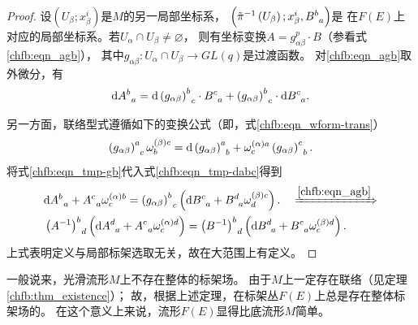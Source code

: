 \begin{proof}
设$\left(U_{\beta} ; x_{\beta}^{i}\right)$是$M$的另一局部坐标系，
$\left(\tilde{\pi}^{-1}\left(U_{\beta}\right) ; x_{\beta}^{i}, B_{\hphantom{a}a}^{b}\right)$是
在$F(E)$上对应的局部坐标系。若$U_{\alpha} \cap U_{\beta} \neq \varnothing$，
则有坐标变换$A=g_{\alpha \beta}^p \cdot B$（参看式\eqref{chfb:eqn_agb}），
其中$g_{\alpha \beta}: U_{\alpha} \cap U_{\beta} \rightarrow GL(q)$是过渡函数。
对\eqref{chfb:eqn_agb}取外微分，有
\begin{equation}\label{chfb:eqn_tmp-dabc}
    \mathrm{d} A_{\hphantom{a}a}^{b}=\mathrm{d}\left(g_{\alpha \beta}\right)_{\hphantom{a}c}^{b} \cdot 
    B_{\hphantom{a}a}^{c}+\left(g_{\alpha \beta}\right)_{\hphantom{a}c}^{b} \cdot \mathrm{d} B_{\hphantom{a}a}^{c}.
\end{equation}

另一方面，联络型式遵循如下的变换公式（即，式\eqref{chfb:eqn_wform-trans}）
\begin{equation}\label{chfb:eqn_tmp-gb}
    \left(g_{\alpha \beta}\right)_{\hphantom{a}c}^{a} \omega_{b}^{(\beta) c}=\mathrm{d}
    \left(g_{\alpha\beta}\right)_{\hphantom{a}b}^{a}+
    \omega_{c}^{(\alpha) a} \left(g_{\alpha \beta}\right)_{\hphantom{a}b}^{c}.
\end{equation}
将式\eqref{chfb:eqn_tmp-gb}代入式\eqref{chfb:eqn_tmp-dabc}得到 
\begin{align*}
    &\mathrm{d} A_{\hphantom{a}a}^{b}+A_{\hphantom{a}a}^{c}  \omega_{c}^{(\alpha) b}
    =\left(g_{\alpha \beta}\right)_{\hphantom{a}c}^{b}\left(\mathrm{d} B_{\hphantom{a}a}^{c}
    +B_{\hphantom{a}a}^{d}  \omega_{d}^{(\beta) c}\right).
\quad \xRightarrow{\ref{chfb:eqn_agb}} \\
&\left(A^{-1}\right)_{\hphantom{a}d}^{b} \left(\mathrm{d} A_{\hphantom{a}a}^{d}
+A_{\hphantom{a}a}^{c}  \omega_{c}^{(\alpha) d}\right)
=\left(B^{-1}\right)_{\hphantom{a}d}^{b}\left(\mathrm{d} B_{\hphantom{a}a}^{d}
+B_{\hphantom{a}a}^{c}  \omega_{c}^{(\beta) d}\right) .
\end{align*}
上式表明定义与局部标架选取无关，故在大范围上有定义。
\end{proof}

一般说来，光滑流形$M$上不存在整体的标架场。
由于$M$上一定存在联络（见定理\ref{chfb:thm_existence}）；
故，根据上述定理，在标架丛$F(E)$上总是存在整体标架场的。
在这个意义上来说，流形$F(E)$显得比底流形$M$简单。


